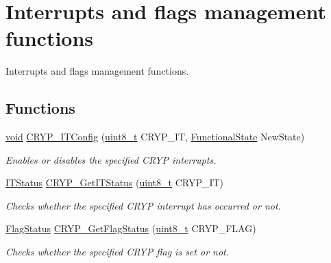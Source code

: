 \hypertarget{group___c_r_y_p___group5}{\section{Interrupts and flags management functions}
\label{group___c_r_y_p___group5}
}


Interrupts and flags management functions.  


\subsection*{Functions}
\begin{DoxyCompactItemize}
\item 
\hyperlink{group___n_a_m_e_ga18028b8badbf1ea7e704ccac3c488e82}{void} \hyperlink{group___c_r_y_p___group5_gafbf5ee5f2c3ae4404149a994e15b33d8}{C\-R\-Y\-P\-\_\-\-I\-T\-Config} (\hyperlink{stdint_8h_aba7bc1797add20fe3efdf37ced1182c5}{uint8\-\_\-t} C\-R\-Y\-P\-\_\-\-I\-T, \hyperlink{group___exported__types_gac9a7e9a35d2513ec15c3b537aaa4fba1}{Functional\-State} New\-State)
\begin{DoxyCompactList}\small\item\em Enables or disables the specified C\-R\-Y\-P interrupts. \end{DoxyCompactList}\item 
\hyperlink{group___exported__types_gaacbd7ed539db0aacd973a0f6eca34074}{I\-T\-Status} \hyperlink{group___c_r_y_p___group5_ga00a48b748ed127fa517cacec9dbf18f4}{C\-R\-Y\-P\-\_\-\-Get\-I\-T\-Status} (\hyperlink{stdint_8h_aba7bc1797add20fe3efdf37ced1182c5}{uint8\-\_\-t} C\-R\-Y\-P\-\_\-\-I\-T)
\begin{DoxyCompactList}\small\item\em Checks whether the specified C\-R\-Y\-P interrupt has occurred or not. \end{DoxyCompactList}\item 
\hyperlink{group___exported__types_ga89136caac2e14c55151f527ac02daaff}{Flag\-Status} \hyperlink{group___c_r_y_p___group5_ga993d568b626a74b2973d4a6848a681f6}{C\-R\-Y\-P\-\_\-\-Get\-Flag\-Status} (\hyperlink{stdint_8h_aba7bc1797add20fe3efdf37ced1182c5}{uint8\-\_\-t} C\-R\-Y\-P\-\_\-\-F\-L\-A\-G)
\begin{DoxyCompactList}\small\item\em Checks whether the specified C\-R\-Y\-P flag is set or not. \end{DoxyCompactList}\end{DoxyCompactItemize}



